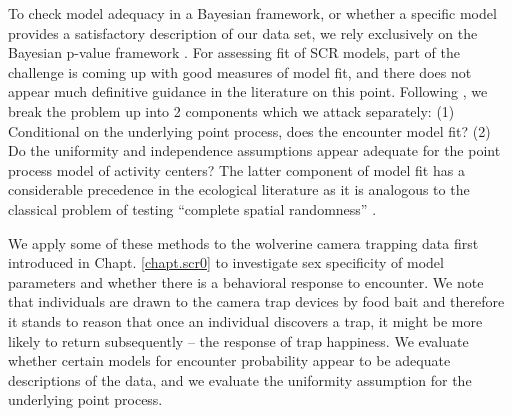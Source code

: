  To check model adequacy in a Bayesian framework, or whether a
specific model provides a satisfactory description of our data set,
we rely exclusively on the Bayesian
p-value framework \citep{gelman_etal:1996}.  For assessing fit of 
SCR models, part of the challenge is coming up with good measures of
model fit, and there does not appear much definitive guidance 
in the literature on this point.  Following \citet{royle_etal:2011mee}, we break the
problem up into 2 components which we attack separately: (1)
Conditional on the underlying point process, does the encounter model
fit? (2) Do the uniformity and independence assumptions appear
adequate for the point process model of activity centers? The latter
component of model fit has a considerable precedence in the
ecological literature as it is analogous to the classical problem of
testing ``complete spatial randomness'' \citep{cressie:1992, illian_etal:2008}.


We apply some of these methods to the wolverine camera trapping
data first introduced in Chapt. \ref{chapt.scr0}
to investigate sex specificity of model parameters and whether
there is a behavioral response to encounter. We note that individuals
are drawn to the camera trap devices by food bait and therefore it
stands to reason that once an individual discovers a trap, it  might
be more likely to return subsequently -- the response of
trap happiness. We evaluate whether certain models for encounter
probability  appear to be
adequate descriptions of the data, and we evaluate the uniformity
assumption for the underlying point process.



\begin{comment}
A basic problem with these two objectives of model selection and model
assessment is their simultaneous use implies a kind of contradiction
which we call the {\it model selectors paradox}: Inferences are always
achieved using standard paradigms of parametric inference (Bayesian or
frequentist) which assert that the model is properly specified. That
is, we assume that the model is truth. This is paradoxical because we
all know that ``all models are wrong'' but, possibly, ``some are
useful.'' In fact, the notion that an ``assumption'' could even be
correct is itself something of an oxymoron.
\end{comment}

\begin{comment}
  Therefore we don't expect
or hope to make assumptions that are ``correct'' in any way. Gelman
and Shalizi (2010) say it this way: ``there is general agreement that,
in this domain, all models in use are wrong -- not just merely
falsifiable, but actually false.''  We should therefore refrain from
over-stating the relevance of any model.  [not sure where I was going
with this point]
\end{comment}



